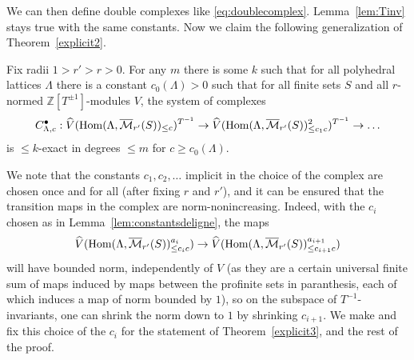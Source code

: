 We can then define double complexes like \eqref{eq:doublecomplex}. Lemma~\ref{lem:Tinv} stays true with the same constants. Now we claim the following generalization of Theorem~\ref{explicit2}.

\begin{theorem}
  \label{explicit3} Fix radii $1>r'>r>0$. For any $m$ there is some $k$ such that for all polyhedral lattices $\Lambda$ there is a constant $c_0(\Lambda)>0$ such that for all finite sets $S$ and all $r$-normed $\mathbb Z[T^{\pm 1}]$-modules $V$, the system of complexes
\[
C_{\Lambda,c}^\bullet: \widehat{V}(\operatorname{Hom}(\Lambda,\overline{\mathcal M}_{r'}(S))_{\leq c})^{T^{-1}}\to \widehat{V}(\operatorname{Hom}(\Lambda,\overline{\mathcal M}_{r'}(S))_{\leq c_1c}^2)^{T^{-1}}\to \ldots
\]
is $\leq k$-exact in degrees $\leq m$ for $c\geq c_0(\Lambda)$.
\end{theorem}

We note that the constants $c_1,c_2,\ldots$ implicit in the choice of the complex are chosen once and for all (after fixing $r$ and $r'$), and it can be ensured that the transition maps in the complex are norm-nonincreasing. Indeed, with the $c_i$ chosen as in Lemma~\ref{lem:constantsdeligne}, the maps
\[
\widehat{V}(\operatorname{Hom}(\Lambda,\overline{\mathcal M}_{r'}(S))_{\leq c_ic}^{a_i})\to \widehat{V}(\operatorname{Hom}(\Lambda,\overline{\mathcal M}_{r'}(S))_{\leq c_{i+1}c}^{a_{i+1}})
\]
will have bounded norm, independently of $V$ (as they are a certain universal finite sum of maps induced by maps between the profinite sets in paranthesis, each of which induces a map of norm bounded by $1$), so on the subspace of $T^{-1}$-invariants, one can shrink the norm down to $1$ by shrinking $c_{i+1}$. We make and fix this choice of the $c_i$ for the statement of Theorem~\ref{explicit3}, and the rest of the proof.

